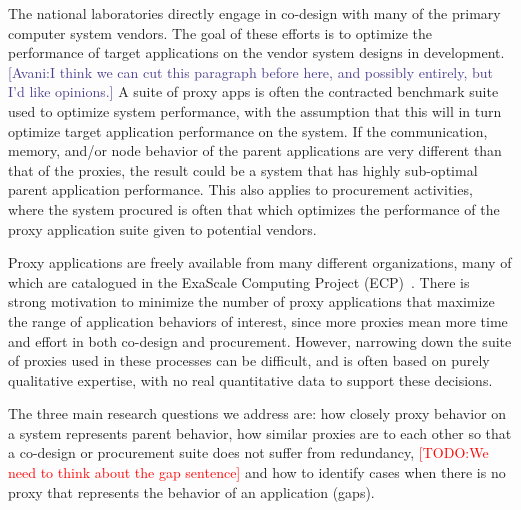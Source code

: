 \documentclass[conference]{IEEEtran}
\newcommand{\avani}[1]          {\textcolor{darkslateblue}{[Avani:#1]}}
\newcommand{\todo}[1]           {\textcolor{red}{[TODO:#1]}}
\begin{document}
The national laboratories directly engage in co-design with many of the primary computer system vendors. The goal of these efforts is to optimize the performance of target applications on the vendor system designs in development.\avani{I think we can cut this paragraph before here, and possibly entirely, but I'd like opinions.}
%
A suite of proxy apps is often the contracted benchmark suite used to optimize system performance, with the assumption that this will in turn optimize target application performance on the system.
%
If the communication, memory, and/or node behavior of the parent applications are very different than that of the proxies, the result could be a system that has highly sub-optimal parent application performance. This also applies to procurement activities, where the system procured is often that which optimizes the performance of the proxy application suite given to potential vendors.  
 

Proxy applications are freely available from many different organizations, many of which are catalogued in the ExaScale Computing Project (ECP)~\cite{ECPProxySuite1}.  There is strong motivation to minimize the number of proxy applications that maximize the range of application behaviors of interest, since more proxies mean more time and effort in both co-design and procurement. However, narrowing down the suite of proxies used in these processes can be difficult, and is often based on purely qualitative expertise, with no real quantitative data to support these decisions. 

The three main research questions we address are: how closely proxy behavior on a system represents parent behavior, how similar proxies are to each other so that a co-design or procurement suite does not suffer from redundancy, \todo{We need to think about the gap sentence} and how to identify cases when there is no proxy that represents the behavior of an application (gaps).
\end{document}
